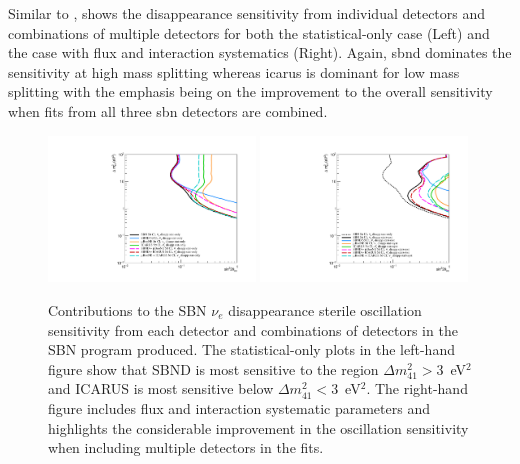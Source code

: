 \newpage
Similar to ,  shows the \nue disappearance sensitivity from individual detectors and combinations of multiple detectors for both the statistical-only case (Left) and the case with flux and interaction systematics (Right). Again, \gls{sbnd} dominates the sensitivity at high mass splitting whereas \gls{icarus} is dominant for low mass splitting with the emphasis being on the improvement to the overall sensitivity when fits from all three \gls{sbn} detectors are combined.

\begin{figure}[h!]
    \centering
    \includegraphics[width = 0.49\textwidth]{figures-chap6/exclusion_contours/nue_disapp_detector_combinations_stat-only.pdf}
    \includegraphics[width = 0.49\textwidth]{figures-chap6/exclusion_contours/nue_disapp_detector_combinations_stat+syst.pdf}
    \caption[\nue disappearance sensitivities from different detector combinations.]{Contributions to the SBN $\nu_e$ disappearance sterile oscillation sensitivity from each detector and combinations of detectors in the SBN program produced. The statistical-only plots in the left-hand figure show that SBND is most sensitive to the region $\Delta m_{41}^{2} > 3$~eV$^{2}$ and ICARUS is most sensitive below $\Delta m_{41}^{2} < 3$~eV$^{2}$. The right-hand figure includes flux and interaction systematic parameters and highlights the considerable improvement in the oscillation sensitivity when including multiple detectors in the fits.}
    \label{fig:nue_disapp_sensitivity_detector_contribution}
\end{figure}

